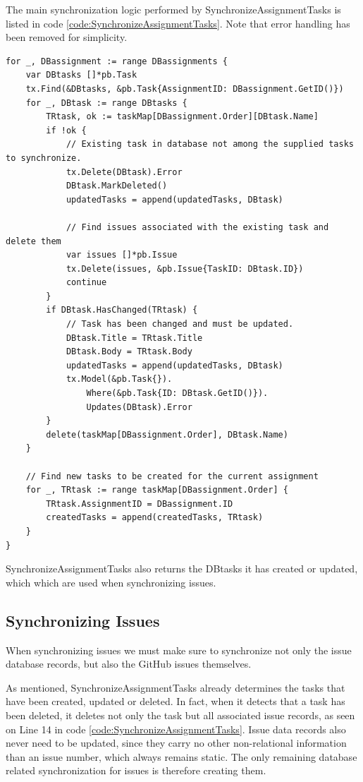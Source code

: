 The main synchronization logic performed by SynchronizeAssignmentTasks is listed in code \ref{code:SynchronizeAssignmentTasks}.
Note that error handling has been removed for simplicity.

\begin{lstlisting}[caption={Task synchronization performed by SynchronizeAssignmentTasks}, 
                            language=Golang, label={code:SynchronizeAssignmentTasks}]
for _, DBassignment := range DBassignments {
	var DBtasks []*pb.Task
	tx.Find(&DBtasks, &pb.Task{AssignmentID: DBassignment.GetID()})
	for _, DBtask := range DBtasks {
		TRtask, ok := taskMap[DBassignment.Order][DBtask.Name]
		if !ok {
			// Existing task in database not among the supplied tasks to synchronize.
			tx.Delete(DBtask).Error
			DBtask.MarkDeleted()
			updatedTasks = append(updatedTasks, DBtask)
			
			// Find issues associated with the existing task and delete them
			var issues []*pb.Issue
			tx.Delete(issues, &pb.Issue{TaskID: DBtask.ID})
			continue
		}
		if DBtask.HasChanged(TRtask) {
			// Task has been changed and must be updated.
			DBtask.Title = TRtask.Title
			DBtask.Body = TRtask.Body
			updatedTasks = append(updatedTasks, DBtask)
			tx.Model(&pb.Task{}).
				Where(&pb.Task{ID: DBtask.GetID()}).
				Updates(DBtask).Error
		}
		delete(taskMap[DBassignment.Order], DBtask.Name)
	}

	// Find new tasks to be created for the current assignment
	for _, TRtask := range taskMap[DBassignment.Order] {
		TRtask.AssignmentID = DBassignment.ID
		createdTasks = append(createdTasks, TRtask)
	}
}
\end{lstlisting}

SynchronizeAssignmentTasks also returns the DBtasks it has created or updated, which which are used when synchronizing issues.

\subsection{Synchronizing Issues}

When synchronizing issues we must make sure to synchronize not only the issue database records, but also the GitHub issues themselves.

As mentioned, SynchronizeAssignmentTasks already determines the tasks that have been created, updated or deleted.
In fact, when it detects that a task has been deleted, it deletes not only the task but all associated issue records, as seen on Line 14 in code \ref{code:SynchronizeAssignmentTasks}.
Issue data records also never need to be updated, since they carry no other non-relational information than an issue number, which always remains static.
The only remaining database related synchronization for issues is therefore creating them.

